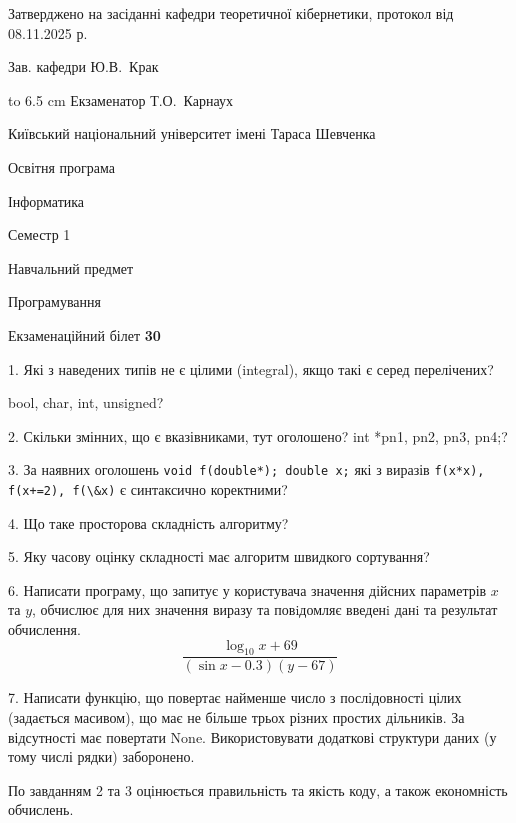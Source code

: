 \documentclass[12pt, ukrainian]{article}
\def\code#1{\Verb!#1!}
\begin{document}
{\smallskip\smallskip \begin {scriptsize} Затверджено на засіданні кафедри теоретичної кібернетики, протокол   від   08.11.2025 р.\par\smallskip\smallskip\smallskip\smallskip
{\parbox {6.5 cm} {Зав. кафедри \dotfill Ю.В.~Крак}}\hspace {0.7cm} {\hbox to 6.5 cm { Екзаменатор \dotfill Т.О.~Карнаух}} \end{scriptsize}}
\vspace{0.9cm}
{{\begin {scriptsize}\par
{ \center  Київський національний університет імені Тараса Шевченка \par}
{\parbox {5 cm}{Освітня програма \hfill}{\parbox {7 cm}{Інформатика\hfill}}\parbox {6 cm}{\hfill Семестр 1}}\par
{\parbox {5 cm} {Навчальний предмет \hfill}\parbox {7 cm}{Програмування \hfill}\parbox {6cm}{\hfill}\par}\vspace{-15pt} \end{scriptsize}}{\center Екзаменаційний білет \No \textbf { 30 }\par}}
{%
1. Які з наведених типів не є цілими (integral), якщо такі є серед перелічених?

bool, char, int, unsigned?
\par
\vspace{2mm}
2. Скільки змінних, що є вказівниками, тут оголошено?
int *pn1, pn2, pn3, pn4;?
\par
\vspace{2mm}
3. За наявних оголошень \code{void f(double*); double x;} які з виразів \code{f(x*x), f(x+=2), f(\&x)} є синтаксично коректними?
\par
\vspace{2mm}
4. Що таке просторова складність алгоритму?
\par
\vspace{2mm}
5. Яку часову оцінку складності має алгоритм швидкого сортування?
\par
\vspace{2mm}
6. Написати програму, що запитує у користувача значення дійсних параметрів $x$ та $y$, обчислює для них значення виразу та повiдомляє введенi данi та результат обчислення.
$$\frac{\log_{10} x + 69}{(\sin x - 0.3) (y - 67)}$$ 

\par
7. Написати функцію, що повертає найменше число з послідовності цілих (задається масивом), що має не більше трьох різних простих дільників. За відсутності має повертати None. Використовувати додаткові структури даних (у тому числі рядки) заборонено.

По завданням 2 та 3 оцінюється правильність та якість коду, а також економність обчислень.

}
\end{document}
